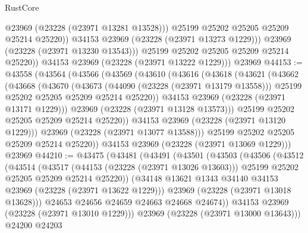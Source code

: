 \begin{lexlean}{RustCore}
\begin{coremodule}
                    @23969
                    (@23228 (@23971 @13281 @13528)))
                  @25199
                  @25202
                  @25205
                  @25209
                  @25214
                  @25220))
              @34153
              @23969
              (@23228 (@23971 @13273 @1229)))
            @23969
            (@23228 (@23971 @13230 @13543)))
          @25199
          @25202
          @25205
          @25209
          @25214
          @25220))
      @34153
      @23969
      (@23228 (@23971 @13222 @1229)))
    @23969
@44153 := @43558
    (@43564
      (@43566
        (@43569
          (@43610
            (@43616
              (@43618
                (@43621
                  (@43662
                    (@43668
                      (@43670
                        (@43673
                          (@44090 (@23228 (@23971 @13179 @13558)))
                          @25199
                          @25202
                          @25205
                          @25209
                          @25214
                          @25220))
                      @34153
                      @23969
                      (@23228 (@23971 @13171 @1229)))
                    @23969
                    (@23228 (@23971 @13128 @13573)))
                  @25199
                  @25202
                  @25205
                  @25209
                  @25214
                  @25220))
              @34153
              @23969
              (@23228 (@23971 @13120 @1229)))
            @23969
            (@23228 (@23971 @13077 @13588)))
          @25199
          @25202
          @25205
          @25209
          @25214
          @25220))
      @34153
      @23969
      (@23228 (@23971 @13069 @1229)))
    @23969
@44210 := @43475
    (@43481
      (@43491
        (@43501
          (@43503
            (@43506
              (@43512
                (@43514
                  (@43517
                    (@44153 (@23228 (@23971 @13026 @13603)))
                    @25199
                    @25202
                    @25205
                    @25209
                    @25214
                    @25220))
                (@34148 @13621 @1343 @34140 @34153 @23969 (@23228 (@23971 @13622 @1229)))
                @23969
                (@23228 (@23971 @13018 @13628)))
              @24653
              @24656
              @24659
              @24663
              @24668
              @24674))
          @34153
          @23969
          (@23228 (@23971 @13010 @1229)))
        @23969
        (@23228 (@23971 @13000 @13643)))
      @24200
      @24203

\end{coremodule}
\end{lexlean}
